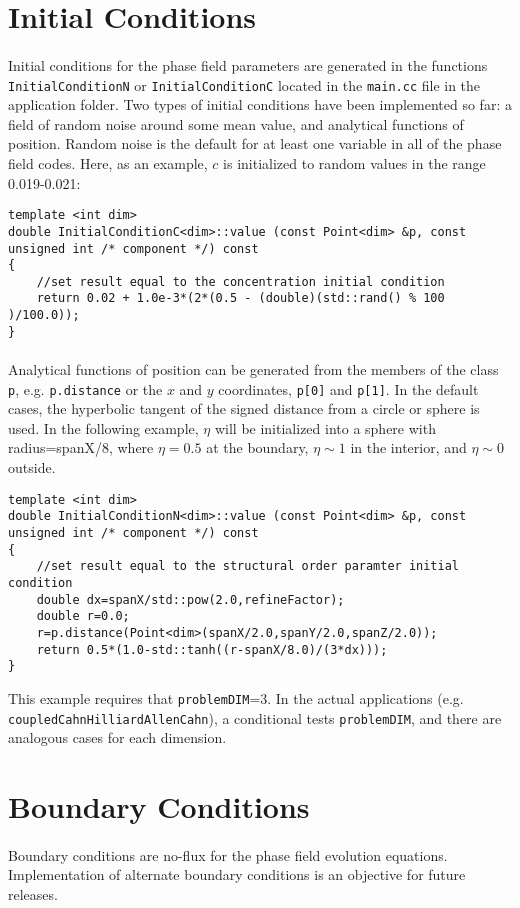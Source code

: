\documentclass[11pt]{article} %
\begin{document}
\section{Initial Conditions}
\paragraph{}
Initial conditions for the phase field parameters are generated in the functions \\ \texttt{InitialConditionN} or \texttt{InitialConditionC} located in the \texttt{main.cc} file in the application folder.  Two types of initial conditions have been implemented so far: a field of random noise around some mean value, and analytical functions of position.  Random noise is the default for at least one variable in all of the phase field codes.  Here, as an example, $c$ is initialized to random values in the range 0.019-0.021:
\begin{lstlisting}
template <int dim>
double InitialConditionC<dim>::value (const Point<dim> &p, const unsigned int /* component */) const
{
	//set result equal to the concentration initial condition
	return 0.02 + 1.0e-3*(2*(0.5 - (double)(std::rand() % 100 )/100.0));
}
\end{lstlisting}
\paragraph{}
Analytical functions of position can be generated from the members of the class \texttt{p}, e.g. \texttt{p.distance} or the $x$ and $y$ coordinates, \texttt{p[0]} and \texttt{p[1]}.  In the default cases,  the hyperbolic tangent of the signed distance from a circle or sphere is used.  In the following example, $\eta$ will be initialized into a sphere with radius=spanX/8, where $\eta=0.5$ at the boundary, $\eta \sim 1$ in the interior, and $\eta \sim 0$ outside.
\begin{lstlisting}
template <int dim>
double InitialConditionN<dim>::value (const Point<dim> &p, const unsigned int /* component */) const
{
	//set result equal to the structural order paramter initial condition
	double dx=spanX/std::pow(2.0,refineFactor);
	double r=0.0;
	r=p.distance(Point<dim>(spanX/2.0,spanY/2.0,spanZ/2.0));
	return 0.5*(1.0-std::tanh((r-spanX/8.0)/(3*dx)));
}
\end{lstlisting}
This example requires that \texttt{problemDIM}=3.  In the actual applications (e.g. \\\texttt{coupledCahnHilliardAllenCahn}), a conditional tests  \texttt{problemDIM}, and there are analogous cases for each dimension.


\section{Boundary Conditions}
\paragraph{}
Boundary conditions are no-flux for the phase field evolution equations.  Implementation of alternate boundary conditions is an objective for future releases.
\end{document}
